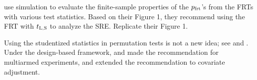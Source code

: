 \begin{HomeworkProblem}\label{exr:8-2}

\citet{zhao2020caFRT} use simulation to evaluate the finite-sample properties of the $p_{\text{frt}}$'s from the FRTs with various test statistics. Based on their Figure 1, they recommend using the FRT with $t_\textsc{L,S} $ to analyze the SRE. Replicate their Figure 1.


\end{HomeworkProblem}

\begin{HomeworkProblem}\label{exr:8-3}

Using the studentized statistics in permutation tests is not a new idea; see \citet{Janssen97} and \citet{Romano13}. Under the design-based framework, \citet{ding2017randomization} and \citet{wu2018randomization} made the recommendation for multiarmed experiments, and  \citet{zhao2020caFRT} extended the recommendation to covariate adjustment.


\end{HomeworkProblem}
